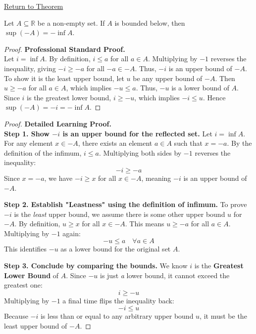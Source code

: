 \newpage
{}
\label{prf:negation-exchange-sup-inf}

\begin{remark*}[Return]
\hyperref[thm:negation-exchange-sup-inf]{Return to Theorem}
\end{remark*}

\begin{theorem*}
Let $A \subseteq \mathbb{R}$ be a non-empty set. If $A$ is bounded below, then $\sup(-A) = -\inf A$.
\end{theorem*}

\begin{proof}
\textbf{Professional Standard Proof.}~\\
Let $i = \inf A$. By definition, $i \le a$ for all $a \in A$. Multiplying by $-1$ reverses the inequality, giving $-i \ge -a$ for all $-a \in -A$. Thus, $-i$ is an upper bound of $-A$. To show it is the least upper bound, let $u$ be any upper bound of $-A$. Then $u \ge -a$ for all $a \in A$, which implies $-u \le a$. Thus, $-u$ is a lower bound of $A$. Since $i$ is the greatest lower bound, $i \ge -u$, which implies $-i \le u$. Hence $\sup(-A) = -i = -\inf A$.
\end{proof}

\begin{proof}
\textbf{Detailed Learning Proof.}~\\

\textbf{Step 1. Show $-i$ is an upper bound for the reflected set.}
Let $i = \inf A$. For any element $x \in -A$, there exists an element $a \in A$ such that $x = -a$. By the definition of the infimum, $i \le a$. Multiplying both sides by $-1$ reverses the inequality:
\[ -i \ge -a \]
Since $x = -a$, we have $-i \ge x$ for all $x \in -A$, meaning $-i$ is an upper bound of $-A$.

\textbf{Step 2. Establish "Leastness" using the definition of infimum.}
To prove $-i$ is the \textit{least} upper bound, we assume there is some other upper bound $u$ for $-A$. By definition, $u \ge x$ for all $x \in -A$. This means $u \ge -a$ for all $a \in A$.
Multiplying by $-1$ again:
\[ -u \le a \quad \forall a \in A \]
This identifies $-u$ as a lower bound for the original set $A$.

\textbf{Step 3. Conclude by comparing the bounds.}
We know $i$ is the \textbf{Greatest Lower Bound} of $A$. Since $-u$ is just \textit{a} lower bound, it cannot exceed the greatest one:
\[ i \ge -u \]
Multiplying by $-1$ a final time flips the inequality back:
\[ -i \le u \]
Because $-i$ is less than or equal to any arbitrary upper bound $u$, it must be the least upper bound of $-A$.
\end{proof}

